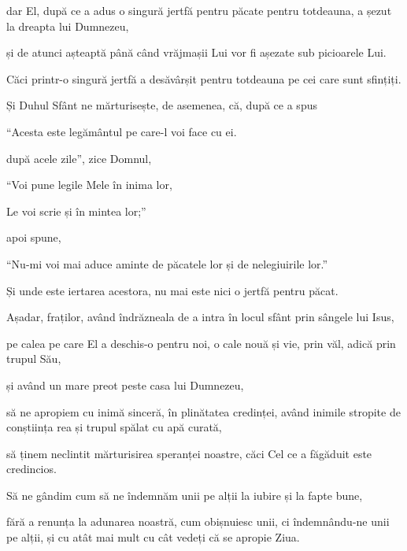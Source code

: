 {dar El, după ce a adus o singură jertfă pentru păcate pentru totdeauna, a șezut la dreapta lui Dumnezeu,

și de atunci așteaptă până când vrăjmașii Lui vor fi așezate sub picioarele Lui.

Căci printr-o singură jertfă a desăvârșit pentru totdeauna pe cei care sunt sfințiți.

Și Duhul Sfânt ne mărturisește, de asemenea, că, după ce a spus


\par }{\Q {}“Acesta este legământul pe care-l voi face cu ei.

\par }{\QB după acele zile”, zice Domnul,

\par }{\Q “Voi pune legile Mele în inima lor,

\par }{\QB Le voi scrie și în mintea lor;”

\par }{\PP apoi spune,


\par }{\Q {}“Nu-mi voi mai aduce aminte de păcatele lor și de nelegiuirile lor.”


\par }{\PP {}Și unde este iertarea acestora, nu mai este nici o jertfă pentru păcat.


\par }{\PP {}Așadar, fraților, având îndrăzneala de a intra în locul sfânt prin sângele lui Isus,

pe calea pe care El a deschis-o pentru noi, o cale nouă și vie, prin văl, adică prin trupul Său,

și având un mare preot peste casa lui Dumnezeu,

să ne apropiem cu inimă sinceră, în plinătatea credinței, având inimile stropite de conștiința rea și trupul spălat cu apă curată,

să ținem neclintit mărturisirea speranței noastre, căci Cel ce a făgăduit este credincios.


\par }{\PP {}Să ne gândim cum să ne îndemnăm unii pe alții la iubire și la fapte bune,

fără a renunța la adunarea noastră, cum obișnuiesc unii, ci îndemnându-ne unii pe alții, și cu atât mai mult cu cât vedeți că se apropie Ziua.


}
